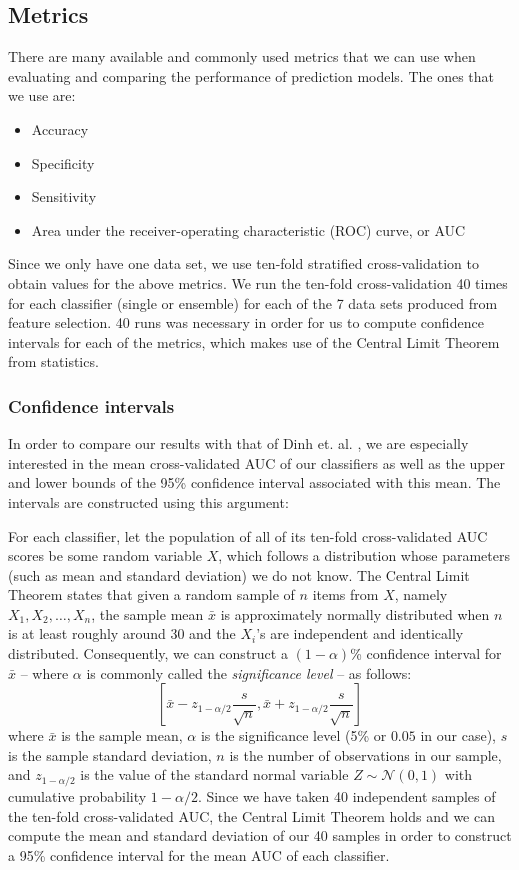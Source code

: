 \subsection{Metrics}
There are many available and commonly used metrics that we can use when
evaluating and comparing the performance of prediction models. The ones that
we use are: 
\begin{itemize}
  \item Accuracy
  \item Specificity
  \item Sensitivity
  \item Area under the receiver-operating characteristic (ROC) curve, or AUC
\end{itemize}

Since we only have one data set, we use ten-fold stratified cross-validation
to obtain values for the above metrics. We run the ten-fold cross-validation
40 times for each classifier (single or ensemble) for each of the 7 data sets
produced from feature selection. 40 runs was necessary in order for us to
compute confidence intervals for each of the metrics, which makes use of the
Central Limit Theorem from statistics.

\subsubsection{Confidence intervals}
In order to compare our results with that of Dinh et. al. \citep{Dinh2013a},
we are especially interested in the mean cross-validated AUC of our
classifiers as well as
the upper and lower bounds of the 95\% confidence interval associated with this
mean. The intervals are constructed using this argument:

For each classifier, let the population of all of its ten-fold cross-validated
AUC scores be some random variable $X$, which follows a distribution whose
parameters (such as mean and standard deviation) we do not know.
The Central Limit Theorem states that given a random
sample of $n$ items from $X$, namely $X_1,X_2,\dots,X_n$, the sample mean
$\bar{x}$
is approximately normally distributed when $n$ is at least roughly around 30
and the $X_i$'s are independent and identically distributed.
Consequently, we can construct a $(1-\alpha)$\% confidence interval for
$\bar{x}$ -- where $\alpha$ is commonly called the
\textit{significance level} -- as follows:
\begin{equation}
  \left[\bar{x} - z_{1-\alpha/2}\dfrac{s}{\sqrt{n}},
    \bar{x} + z_{1-\alpha/2}\dfrac{s}{\sqrt{n}}\right]
\end{equation}
where $\bar{x}$ is the sample mean, $\alpha$ is the significance level
(5\% or $0.05$ in our case), $s$ is the sample standard deviation, $n$
is the number of observations in our sample, and $z_{1-\alpha/2}$ is the value
of the standard normal variable $Z \sim \mathcal{N}(0,1)$ with cumulative
probability $1-\alpha/2$. Since we have taken 40 independent samples of the
ten-fold cross-validated AUC, the Central Limit Theorem holds and we can
compute the mean and standard deviation of our 40 samples in order to
construct a 95\% confidence interval for the mean AUC of each classifier.

